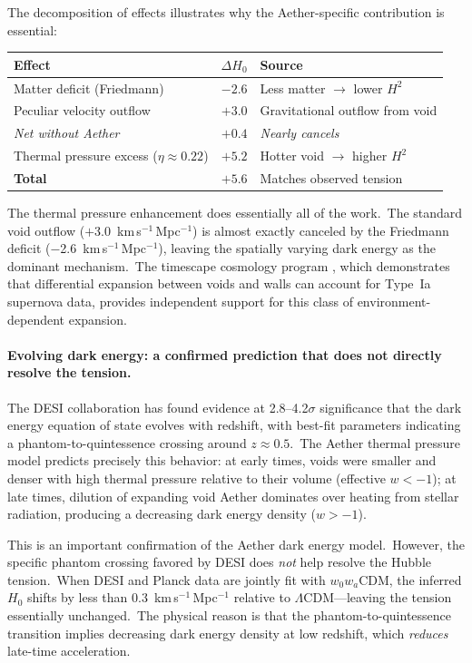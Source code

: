 ﻿\documentclass[12pt,letterpaper]{article}
\begin{document}
The decomposition of effects illustrates why the Aether-specific contribution
is essential:
%
\begin{center}
\begin{tabular}{@{} l r l @{}}
\toprule
Effect & $\Delta H_0$ & Source \\
\midrule
Matter deficit (Friedmann)  & $-2.6$ & Less matter $\rightarrow$ lower $H^2$ \\
Peculiar velocity outflow   & $+3.0$ & Gravitational outflow from void \\
\emph{Net without Aether}   & $+0.4$ & \emph{Nearly cancels} \\[4pt]
Thermal pressure excess ($\eta \approx 0.22$) & $+5.2$ & Hotter void $\rightarrow$ higher $H^2$ \\
\midrule
\textbf{Total}              & $+5.6$ & Matches observed tension \\
\bottomrule
\end{tabular}
\end{center}
%
The thermal pressure enhancement does essentially all of the work.\ The standard
void outflow ($+$3.0~km\,s$^{-1}$\,Mpc$^{-1}$) is almost exactly canceled by the
Friedmann deficit ($-$2.6~km\,s$^{-1}$\,Mpc$^{-1}$), leaving the spatially
varying dark energy as the dominant mechanism.\ The timescape cosmology program
\cite{wiltshire2025}, which demonstrates that differential expansion between
voids and walls can account for Type~Ia supernova data, provides independent
support for this class of environment-dependent expansion.

\paragraph{Evolving dark energy: a confirmed prediction that does not directly
resolve the tension.}
The DESI collaboration has found evidence at 2.8--4.2$\sigma$ significance
\cite{desi2025} that the dark energy equation of state evolves with redshift,
with best-fit parameters indicating a phantom-to-quintessence crossing around
$z \approx 0.5$.\ The Aether thermal pressure model predicts precisely this
behavior: at early times, voids were smaller and denser with high thermal
pressure relative to their volume (effective $w < -1$); at late times, dilution
of expanding void Aether dominates over heating from stellar radiation, producing
a decreasing dark energy density ($w > -1$).

This is an important confirmation of the Aether dark energy model.\ However, the
specific phantom crossing favored by DESI does \emph{not} help resolve the
Hubble tension.\ When DESI and Planck data are jointly fit with $w_0 w_a$CDM,
the inferred $H_0$ shifts by less than 0.3~km\,s$^{-1}$\,Mpc$^{-1}$ relative
to $\Lambda$CDM---leaving the tension essentially unchanged.\ The physical
reason is that the phantom-to-quintessence transition implies decreasing dark
energy density at low redshift, which \emph{reduces} late-time acceleration.
\end{document}
